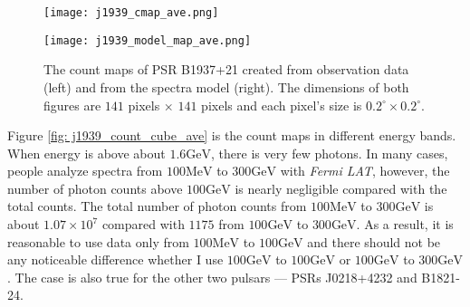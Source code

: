 \documentclass[12pt]{report}
\begin{document}
        \begin{figure}[!ht]
          \begin{center}
          \begin{minipage}{0.45\textwidth}
            \begin{center} 
              \texttt{[image: j1939\_cmap\_ave.png]}
            \end{center}
          \end{minipage}
          \begin{minipage}{0.45\textwidth}
            \begin{center}
              \texttt{[image: j1939\_model\_map\_ave.png]}
            \end{center}
          \end{minipage}
        \end{center}
        \caption{The count maps of PSR B1937+21 created from observation 
            data (left) and from the spectra model (right). The dimensions
            of both figures are $141$ pixels $\times$ $141$ pixels and each pixel's size is
            $0.2^{\circ}\times0.2^{\circ}$.}
          \label{fig: j1939_count_map_ave}
        \end{figure}

        Figure \ref{fig: j1939_count_cube_ave} is the count maps in different energy bands.
        When energy is above about $1.6\mbox{GeV}$, there is very few photons. In many cases,
        people analyze spectra from $100\mbox{MeV}$ to $300\mbox{GeV}$ with 
        \textit{Fermi LAT}, however, the number of photon counts above $100\mbox{GeV}$ is 
        nearly negligible compared with the total counts. The total number of photon counts 
        from $100\mbox{MeV}$ to $300\mbox{GeV}$ is about $1.07\times10^7$ compared with 
        $1175$ from $100\mbox{GeV}$ to $300\mbox{GeV}$. As a result, it is reasonable to 
        use data only from $100\mbox{MeV}$ to $100\mbox{GeV}$ and there should not be any 
        noticeable difference whether I use $100\mbox{GeV}$ to $100\mbox{GeV}$ or 
        $100\mbox{GeV}$ to $300\mbox{GeV}$. The case is also true for 
        the other two pulsars --- PSRs J0218+4232 and B1821-24. 
\end{document}
